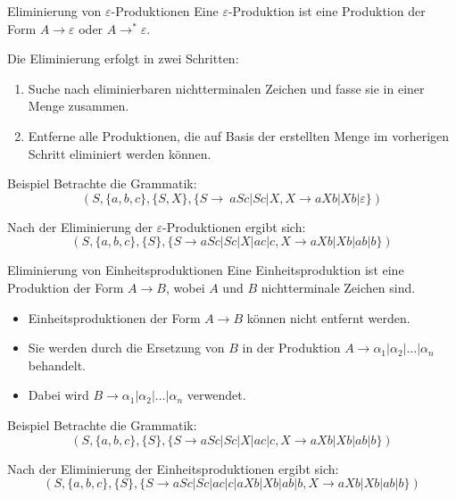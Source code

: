 \documentclass{beamer}
\begin{document}
		\begin{frame}{Eliminierung von $\varepsilon$-Produktionen}
			Eine $\varepsilon$-Produktion ist eine Produktion der Form $A \to \varepsilon$ oder $A \to ^{*} \varepsilon$.
			\pause
			
			Die Eliminierung erfolgt in zwei Schritten:
			\begin{enumerate}
				\item Suche nach eliminierbaren nichtterminalen Zeichen und fasse sie in einer Menge zusammen.
				\item Entferne alle Produktionen, die auf Basis der erstellten Menge im vorherigen Schritt eliminiert werden können.
			\end{enumerate}
			
			\pause
			
			\begin{block}{Beispiel}
				Betrachte die Grammatik:
				$$(S, \{ a, b, c \}, \{ S, X \}, \{ S \to \ aSc | Sc | X, X \to aXb | Xb | \varepsilon \} )$$
				
				Nach der Eliminierung der $\varepsilon$-Produktionen ergibt sich:
				$$(S, \{ a, b, c \}, \{ S\}, \{ S \to aSc | Sc | X | ac |  c, X \to aXb | Xb | ab | b \})$$
			\end{block}
		\end{frame}
				
		\begin{frame}{Eliminierung von Einheitsproduktionen}
			Eine Einheitsproduktion ist eine Produktion der Form $A \to B$, wobei $A$ und $B$ nichtterminale Zeichen sind.
			\pause
			
			\begin{itemize}
				\item Einheitsproduktionen der Form $A \to B$ können nicht entfernt werden.
				\item Sie werden durch die Ersetzung von $B$ in der Produktion $A \to \alpha_1|\alpha_2|\ldots|\alpha_n$ behandelt.
				\item Dabei wird $B \to \alpha_1|\alpha_2|\ldots|\alpha_n$ verwendet.
			\end{itemize}
			
			\pause
			
			\begin{block}{Beispiel}
				Betrachte die Grammatik:
				$$(S, \{ a, b, c \}, \{ S\}, \{ S \to aSc | Sc | X | ac |  c, X \to aXb | Xb | ab | b \})$$
				
				Nach der Eliminierung der Einheitsproduktionen ergibt sich:
				$$(S, \{ a, b, c \}, \{ S\}, \{ S \to aSc | Sc | ac |  c | aXb | Xb | ab | b, X \to aXb | Xb | ab | b \})$$
			\end{block}
		\end{frame}
	
\end{document}
